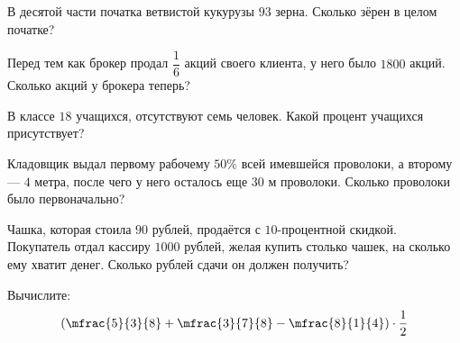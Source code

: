 \begin{homework}[number=3]
	\begin{listofex}
		\item В десятой части початка ветвистой кукурузы \(93\) зерна. Сколько зёрен в целом початке?
		\item Перед тем как брокер продал \( \dfrac{1}{6} \) акций своего клиента, у него было \(1800\) акций. Сколько акций у брокера теперь?
		\item В классе  \(18\)  учащихся, отсутствуют семь человек. Какой процент учащихся присутствует?
		\item Кладовщик выдал первому рабочему \(50 \% \) всей имевшейся проволоки, а второму --- \(4\) метра, после чего у него осталось еще \(30\) м проволоки. Сколько проволоки было первоначально?
		\item Чашка, которая стоила \(90\) рублей, продаётся с \(10\)-процентной скидкой. Покупатель отдал кассиру \(1000\) рублей, желая купить столько чашек, на сколько ему хватит денег. Сколько рублей сдачи он должен получить?
		\item Вычислите:
		\[ \left( \mfrac{5}{3}{8} + \mfrac{3}{7}{8} - \mfrac{8}{1}{4} \right) \cdot \dfrac{1}{2} \]
	\end{listofex}
\end{homework}

